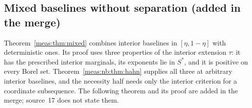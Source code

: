 \documentclass[11pt]{article}
\numberwithin{equation}{section}
\theoremstyle{definition}
\theoremstyle{remark}
\begin{document}
\subsection{Mixed baselines without separation (added in the merge)}
\label{meas:nb:sub:mixed}

Theorem~\ref{meas:thm:mixed} combines interior baselines in $[\eta,1-\eta]$ with
deterministic ones. Its proof uses three properties of the interior extension
$\tau$: it has the prescribed interior marginals, its exponents lie in $S^*$, and
it is positive on every Borel set. Theorem~\ref{meas:nb:thm:hahn} supplies all three
at arbitrary interior baselines, and the necessity half needs only the interior
criterion for a coordinate subsequence. The following theorem and its proof are
added in the merge; source~17 does not state them.
\end{document}
